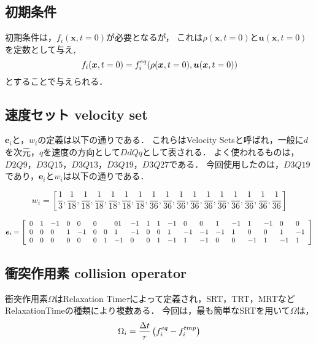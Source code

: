 \subsection{初期条件}
初期条件は，$f_i(\bm{x}, t=0)$が必要となるが，
これは$\rho(\bm{x}, t=0)$と$\bm{u}(\bm{x}, t=0)$を定数として与え,
\begin{equation}\label{eq:initial-ddf}
    f_i(\bm{x}, t=0) = f^{eq}_{i}(\rho(\bm{x}, t=0), \bm{u}(\bm{x}, t=0))
\end{equation}
とすることで与えられる．

\subsection{速度セット velocity set}
$\bm{e}_i$と，$w_i$の定義は以下の通りである．
これらはVelocity Setsと呼ばれ，一般に$d$を次元，$q$を速度の方向として$DdQq$として表される．
よく使われるものは，$D2Q9$，$D3Q15$，$D3Q13$，$D3Q19$，$D3Q27$である．
今回使用したのは，$D3Q19$であり，$\bm{e}_i$と$w_i$は以下の通りである．

\begin{landscape}
    \centering
    \begin{equation}
        w_i = \left[
            \frac{1}{3}, \frac{1}{18}, \frac{1}{18}, \frac{1}{18}, \frac{1}{18}, \frac{1}{18}, \frac{1}{18}, \frac{1}{36}, \frac{1}{36}, \frac{1}{36}, \frac{1}{36}, \frac{1}{36}, \frac{1}{36}, \frac{1}{36}, \frac{1}{36}, \frac{1}{36}, \frac{1}{36}
            \right]
    \end{equation}

    \begin{equation}
        \bm{e}_i =
        \left[
            \begin{array}[]{llllllllllllllllllll}
                0 & 1 & -1 & 0 & 0  & 0 &   & 0 1 & -1 & 1 & 1 & -1 & 0  & 0  & 1  & -1 & 1  & -1 & 0  & 0  \\
                0 & 0 & 0  & 1 & -1 & 0 & 0 & 1   & -1 & 0 & 0 & 1  & -1 & -1 & -1 & 1  & 0  & 0  & 1  & -1 \\
                0 & 0 & 0  & 0 & 0  & 0 & 1 & -1  & 0  & 0 & 1 & -1 & 1  & -1 & 0  & 0  & -1 & 1  & -1 & 1
            \end{array}
            \right]
    \end{equation}
\end{landscape}

\subsection{衝突作用素 collision operator}
衝突作用素$\Omega$はRelaxation Time$\tau$によって定義され，SRT，TRT，MRTなどRelaxationTimeの種類により複数ある．
今回は，最も簡単なSRTを用いて$\Omega$は，
\begin{equation}
    \Omega_i = \frac{\Delta t}{\tau} \left( f^{eq}_{i} - f^{tmp}_{i} \right)
\end{equation}

